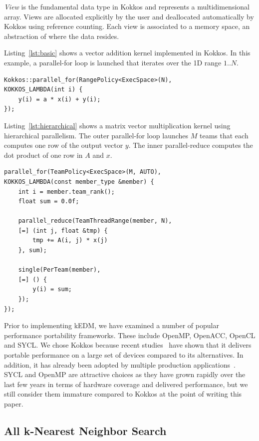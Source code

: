 \documentclass[conference]{IEEEtran}
\begin{document}
\textit{View} is the fundamental data type in Kokkos and represents a
multidimensional array. Views are allocated explicitly by the user and
deallocated automatically by Kokkos using reference counting.
Each view is associated to a memory space, an abstraction of
where the data resides.

Listing~\ref{lst:basic} shows a vector addition  kernel implemented in Kokkos.
In this example, a parallel-for loop is launched that iterates over the 1D
range $1..N$.

\begin{lstlisting}[caption={Basic data parallel loop},label={lst:basic}]
Kokkos::parallel_for(RangePolicy<ExecSpace>(N),
KOKKOS_LAMBDA(int i) {
    y(i) = a * x(i) + y(i);
});
\end{lstlisting}

Listing~\ref{lst:hierarchical} shows a matrix vector multiplication kernel
using hierarchical parallelism. The outer parallel-for loop launches $M$ teams
that each computes one row of the output vector $y$. The inner parallel-reduce
computes the dot product of one row in $A$ and $x$.

\begin{lstlisting}[caption={Hierarchical data parallel loop},label={lst:hierarchical}]
parallel_for(TeamPolicy<ExecSpace>(M, AUTO),
KOKKOS_LAMBDA(const member_type &member) {
    int i = member.team_rank();
    float sum = 0.0f;

    parallel_reduce(TeamThreadRange(member, N),
    [=] (int j, float &tmp) {
        tmp += A(i, j) * x(j)
    }, sum);

    single(PerTeam(member),
    [=] () {
        y(i) = sum;
    });
});
\end{lstlisting}

Prior to implementing kEDM, we have examined a number of popular performance
portability frameworks. These include OpenMP, OpenACC, OpenCL and SYCL\@. We
chose Kokkos  because recent studies~\cite{Martineau2017, Deakin2019, Deakin2020}
have shown that it delivers portable performance on a large set of devices
compared to its alternatives. In addition, it has already been adopted by
multiple production applications~\cite{Sprague2020,Holmen2017,Demeshko2019}.
SYCL and OpenMP are attractive choices as they have grown rapidly over the
last few years in terms of hardware coverage and delivered performance, but we
still consider them immature compared to Kokkos at the point of writing this
paper.

\subsection{All k-Nearest Neighbor Search}
\end{document}

